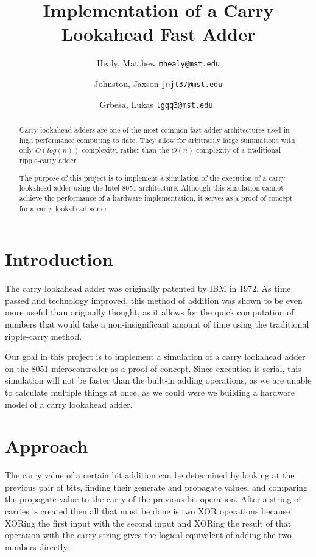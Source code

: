 \documentclass[journal]{IEEEtran}
\begin{document}
\title{Implementation of a Carry Lookahead Fast Adder}
\author{
	Healy, Matthew
	\texttt{mhealy@mst.edu}\\
	\and
	Johnston, Jaxson
	\texttt{jnjt37@mst.edu}\\
	\and
	Grbe\`sa, Lukas
	\texttt{lgqq3@mst.edu}\
}

\maketitle


\begin{abstract}
Carry lookahead adders are one of the most common fast-adder architectures
used in high performance computing to date. They allow for arbitrarily large
summations with only $O(log(n))$ complexity, rather than the $O(n)$ complexity
of a traditional ripple-carry adder.

The purpose of this project is to implement a simulation of the execution
of a carry lookahead adder using the Intel 8051 architecture. Although this
simulation cannot achieve the performance of a hardware implementation, it
serves as a proof of concept for a carry lookahead adder.

\end{abstract}

\section{Introduction}\label{sec:intro}
The carry lookahead adder was originally patented by IBM\cite{patent} in 1972.
As time passed and technology improved, this method of addition was shown
to be even more useful than originally thought, as it allows for the quick
computation of numbers that would take a non-insignificant amount of time
using the traditional ripple-carry method.

Our goal in this project is to implement a simulation of a carry lookahead
adder on the 8051 microcontroller as a proof of concept. Since execution is
serial, this simulation will not be faster than the built-in adding operations,
as we are unable to calculate multiple things at once, as we could were we
building a hardware model of a carry lookahead adder.

\section{Approach}\label{sec:approach}
The carry value of a certain bit addition
can be determined by looking at the previous
pair of bits, finding their generate and propagate values, and comparing the
propagate value to the carry of the previous bit operation. After a string of
carries is created then all that must be done is two XOR operations because
XORing the first input with the second input and XORing the result of that
operation with the carry string gives the logical equivalent of adding the two
numbers directly.
\end{document}
